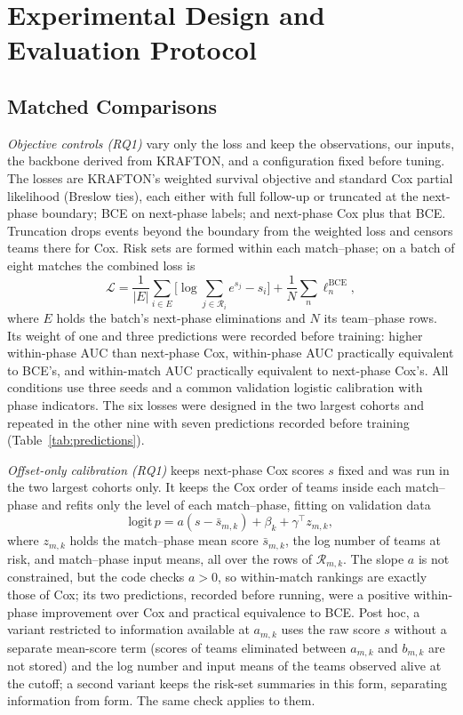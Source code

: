\documentclass[sigconf,anonymous]{acmart}
\begin{document}
\section{Experimental Design and Evaluation Protocol}
\label{sec:method:evaluation}
\subsection{Matched Comparisons}
\label{sec:method:decomposition}
\emph{Objective controls (RQ1)} vary only the loss and keep the observations, our inputs, the backbone derived from KRAFTON, and a configuration fixed before tuning. The losses are KRAFTON's weighted survival objective and standard Cox partial likelihood (Breslow ties), each either with full follow-up or truncated at the next-phase boundary; BCE on next-phase labels; and next-phase Cox plus that BCE. Truncation drops events beyond the boundary from the weighted loss and censors teams there for Cox. Risk sets are formed within each match--phase; on a batch of eight matches the combined loss is
\begin{equation}
\mathcal{L}=\frac{1}{|E|}\sum_{i\in E}\Big[\log\sum_{j\in\mathcal{R}_i}e^{s_j}-s_i\Big]+\frac{1}{N}\sum_{n}\ell^{\mathrm{BCE}}_n,
\label{eq:combined}
\end{equation}
where $E$ holds the batch's next-phase eliminations and $N$ its team--phase rows. Its weight of one and three predictions were recorded before training: higher within-phase AUC than next-phase Cox, within-phase AUC practically equivalent to BCE's, and within-match AUC practically equivalent to next-phase Cox's. All conditions use three seeds and a common validation logistic calibration with phase indicators. The six losses were designed in the two largest cohorts and repeated in the other nine with seven predictions recorded before training (Table~\ref{tab:predictions}).

\emph{Offset-only calibration (RQ1)} keeps next-phase Cox scores $s$ fixed and was run in the two largest cohorts only. It keeps the Cox order of teams inside each match--phase and refits only the level of each match--phase, fitting on validation data
\begin{equation}
\mathrm{logit}\,p=a(s-\bar s_{m,k})+\beta_k+\gamma^{\top}z_{m,k},
\label{eq:offset}
\end{equation}
where $z_{m,k}$ holds the match--phase mean score $\bar s_{m,k}$, the log number of teams at risk, and match--phase input means, all over the rows of $\mathcal{R}_{m,k}$. The slope $a$ is not constrained, but the code checks $a>0$, so within-match rankings are exactly those of Cox; its two predictions, recorded before running, were a positive within-phase improvement over Cox and practical equivalence to BCE. Post hoc, a variant restricted to information available at $a_{m,k}$ uses the raw score $s$ without a separate mean-score term (scores of teams eliminated between $a_{m,k}$ and $b_{m,k}$ are not stored) and the log number and input means of the teams observed alive at the cutoff; a second variant keeps the risk-set summaries in this form, separating information from form. The same check applies to them.
\end{document}
